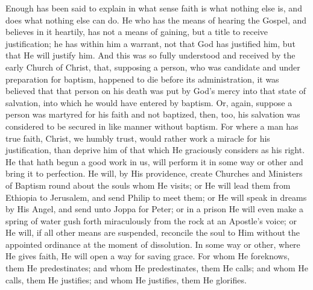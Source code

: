 Enough has been said to explain in what sense faith is what nothing
else is, and does what nothing else can do. He who has the means of
hearing the Gospel, and believes in it heartily, has not a means of
gaining, but a title to receive justification; he has within him a
warrant, not that God has justified him, but that He will justify him.
And this was so fully understood and received by the early Church of
Christ, that, supposing a person, who was candidate and under
preparation for baptism, happened to die before its administration, it
was believed that that person on his death was put by God's mercy into
that state of salvation, into which he would have entered by baptism.
Or, again, suppose a person was martyred for his faith and not
baptized, then, too, his salvation was considered to be secured in
like manner without baptism. For where a man has true faith, Christ,
we humbly trust, would rather work a miracle for his justification,
than deprive him of that which He graciously considers as his right.
He that hath begun a good work in us, will perform it in some way or
other and bring it to perfection. He will, by His providence, create
Churches and Ministers of Baptism round about the souls whom He
visits; or He will lead them from Ethiopia to Jerusalem, and send
Philip to meet them; or He will speak in dreams by His Angel, and send
unto Joppa for Peter; or in a prison He will even make a spring of
water gush forth miraculously from the rock at an Apostle's voice; or
He will, if all other means are suspended, reconcile the soul to Him
without the appointed ordinance at the moment of dissolution. In some
way or other, where He gives faith, He will open a way for saving
grace. For whom He foreknows, them He predestinates; and whom He
predestinates, them He calls; and whom He calls, them He justifies;
and whom He justifies, them He glorifies.

